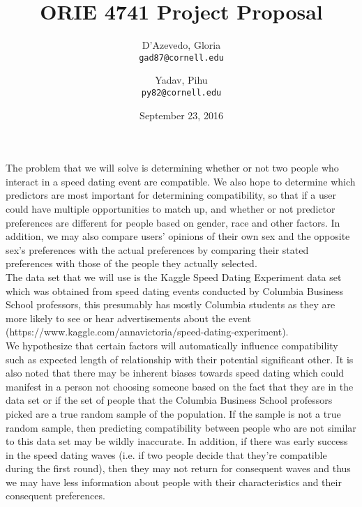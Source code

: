 \documentclass{article}
\title{ORIE 4741 Project Proposal}
\author{
  D'Azevedo, Gloria\\
  \texttt{gad87@cornell.edu}
  \and
  Yadav, Pihu\\
  \texttt{py82@cornell.edu}
}
\date{September 23, 2016}
\begin{document}
\maketitle

The problem that we will solve is determining whether or not two people who interact in a speed dating event are compatible. We also hope to determine which predictors are most important for determining compatibility, so that if a user could have multiple opportunities to match up, and whether or not predictor preferences are different for people based on gender, race and other factors. In addition, we may also compare users’ opinions of their own sex and the opposite sex’s preferences with the actual preferences by comparing their stated preferences with those of the people they actually selected. \\

The data set that we will use is the Kaggle Speed Dating Experiment data set which was obtained from speed dating events conducted by Columbia Business School professors, this presumably has mostly Columbia students as they are more likely to see or hear advertisements about the event \\ 
    (https://www.kaggle.com/annavictoria/speed-dating-experiment). \\

We hypothesize that certain factors will automatically influence compatibility such as expected length of relationship with their potential significant other.  It is also noted that there may be inherent biases towards speed dating which could manifest in a person not choosing someone based on the fact that they are in the data set or if the set of people that the Columbia Business School professors picked are a true random sample of the population.  If the sample is not a true random sample, then predicting compatibility between people who are not similar to this data set may be wildly inaccurate.  In addition, if there was early success in the speed dating waves (i.e. if two people decide that they’re compatible during the first round), then they may not return for consequent waves and thus we may have less information about people with their characteristics and their consequent preferences.\\
\end{document}
